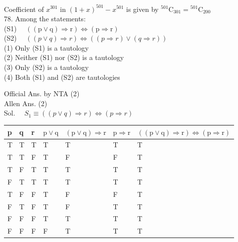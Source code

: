 \documentclass[10pt]{article}
\begin{document}
Coefficient of \(x^{301}\) in \((1+x)^{501}-x^{501}\) is given by \({ }^{501} \mathrm{C}_{301}={ }^{501} \mathrm{C}_{200}\)\\
78. Among the statements:\\
(S1) \(\quad((\mathrm{p} \vee \mathrm{q}) \Rightarrow \mathrm{r}) \Leftrightarrow(\mathrm{p} \Rightarrow \mathrm{r})\)\\
(S2) \(\quad((p \vee q) \Rightarrow r) \Leftrightarrow((p \Rightarrow r) \vee(q \Rightarrow r))\)\\
(1) Only (S1) is a tautology\\
(2) Neither (S1) nor (S2) is a tautology\\
(3) Only (S2) is a tautology\\
(4) Both (S1) and (S2) are tautologies

Official Ans. by NTA (2)\\
Allen Ans. (2)\\
Sol. \(\quad S_{1} \equiv((p \vee q) \Rightarrow r) \Leftrightarrow(p \Rightarrow r)\)

\begin{center}
\begin{tabular}{|l|l|l|l|l|l|l|}
\hline
p & q & r & \(\mathrm{p} \vee \mathrm{q}\) & \((\mathrm{p} \vee \mathrm{q}) \Rightarrow \mathrm{r}\) & \(\mathrm{p} \Rightarrow \mathrm{r}\) & \(((\mathrm{p} \vee \mathrm{q}) \Rightarrow \mathrm{r}) \Leftrightarrow(\mathrm{p} \Rightarrow \mathrm{r})\) \\
\hline
T & T & T & T & T & T & T \\
\hline
T & T & F & T & F & F & T \\
\hline
T & F & T & T & T & T & T \\
\hline
F & T & T & T & T & T & T \\
\hline
T & F & F & T & F & F & T \\
\hline
F & T & F & T & F & T & T \\
\hline
F & F & F & T & T & T & T \\
\hline
F & F & F & F & T & T & T \\
\hline
\end{tabular}
\end{center}
\end{document}
